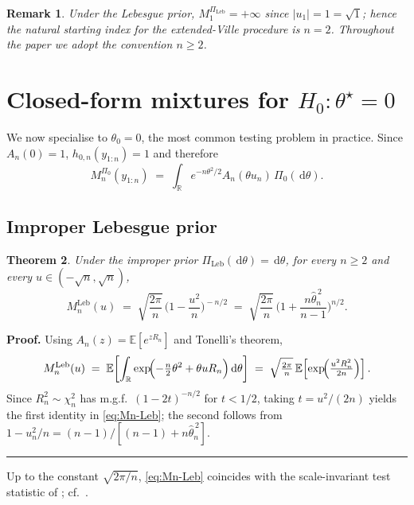 \documentclass{article}%
\newtheorem{theorem}{Theorem}[section]
\newtheorem{remark}[theorem]{Remark}
\newenvironment{proof}[1][Proof]{\noindent\textbf{#1.} }{\ \rule{0.5em}{0.5em}}
\newcommand{\R}{\mathbb{R}}
\newcommand{\E}{\mathbb{E}}
\newcommand{\dd}{\,\mathrm{d}}
\newcommand{\Leb}{\mathrm{Leb}}
\begin{document}
\begin{remark}\label{rem:start-n2}
Under the Lebesgue prior, \(M_1^{\Pi_{\Leb}}=+\infty\) since
\(|u_1|=1=\sqrt 1\); hence the natural starting index for the
extended-Ville procedure is \(n=2\). Throughout the paper we adopt
the convention \(n\geq 2\).
\end{remark}

\section{Closed-form mixtures for \(H_0:\theta^\star=0\)}\label{sec:closedform}

We now specialise to \(\theta_0=0\), the most common testing problem
in practice. Since \(A_n(0)=1\),
\(h_{0,n}(y_{1:n})=1\) and therefore
\begin{equation}\label{eq:Mn-zero}
   M_n^{\Pi_0}(y_{1:n})\;=\;\int_\R e^{-n\theta^2/2}A_n(\theta u_n)
                     \,\Pi_0(\dd\theta).
\end{equation}

\subsection{Improper Lebesgue prior}\label{ssec:Leb}

\begin{theorem}\label{thm:Mn-Leb}
Under the improper prior \(\Pi_{\Leb}(\dd\theta)=\dd\theta\), for
every \(n\geq 2\) and every \(u\in(-\sqrt n,\sqrt n)\),
\begin{equation}\label{eq:Mn-Leb}
  M_n^{\Leb}(u)\;=\;\sqrt{\frac{2\pi}{n}}\,
  \biggl(1-\frac{u^2}{n}\biggr)^{\!-n/2}
  \;=\;\sqrt{\frac{2\pi}{n}}\,
  \biggl(1+\frac{n\widehat\theta_n^{\,2}}{n-1}\biggr)^{\!n/2}.
\end{equation}
\end{theorem}

\begin{proof}
    Using \(A_n(z)=\E[e^{zR_n}]\) and Tonelli's theorem,
\[
  M_n^{\Leb}(u)
  \;=\;\E\!\left[\int_\R \exp\!\Bigl(-\tfrac n2\theta^2
  +\theta uR_n\Bigr)\dd\theta\right]
  \;=\;\sqrt{\tfrac{2\pi}{n}}\,
       \E\!\left[\exp\!\Bigl(\tfrac{u^2 R_n^2}{2n}\Bigr)\right].
\]
Since \(R_n^2\sim\chi_n^2\) has m.g.f.\
\((1-2t)^{-n/2}\) for \(t<1/2\), taking \(t=u^2/(2n)\) yields the first
identity in \eqref{eq:Mn-Leb}; the second follows from
\(1-u_n^2/n=(n-1)/[(n-1)+n\widehat\theta_n^{\,2}]\).
\end{proof}

Up to the constant \(\sqrt{2\pi/n}\), \eqref{eq:Mn-Leb} coincides with
the scale-invariant test statistic of \cite[Theorem 2]{Lai1976}; cf.\
\cite[Theorem 4.1]{Wang2025}.
\end{document}
